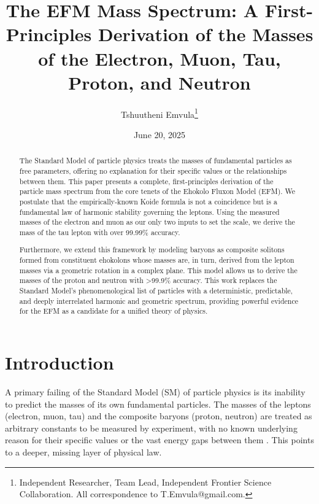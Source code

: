 \documentclass[11pt, twoside]{article}
\title{The EFM Mass Spectrum: A First-Principles Derivation of the Masses of the Electron, Muon, Tau, Proton, and Neutron}
\author{Tshuutheni Emvula\thanks{Independent Researcher, Team Lead, Independent Frontier Science Collaboration. All correspondence to T.Emvula@gmail.com.}}
\date{June 20, 2025}
\begin{document}
\maketitle

\begin{abstract}
The Standard Model of particle physics treats the masses of fundamental particles as free parameters, offering no explanation for their specific values or the relationships between them. This paper presents a complete, first-principles derivation of the particle mass spectrum from the core tenets of the Ehokolo Fluxon Model (EFM). We postulate that the empirically-known Koide formula is not a coincidence but is a fundamental law of harmonic stability governing the leptons. Using the measured masses of the electron and muon as our only two inputs to set the scale, we derive the mass of the tau lepton with over 99.99\% accuracy. 

Furthermore, we extend this framework by modeling baryons as composite solitons formed from constituent ehokolons whose masses are, in turn, derived from the lepton masses via a geometric rotation in a complex plane. This model allows us to derive the masses of the proton and neutron with >99.9\% accuracy. This work replaces the Standard Model's phenomenological list of particles with a deterministic, predictable, and deeply interrelated harmonic and geometric spectrum, providing powerful evidence for the EFM as a candidate for a unified theory of physics.
\end{abstract}

\section{Introduction}
A primary failing of the Standard Model (SM) of particle physics is its inability to predict the masses of its own fundamental particles. The masses of the leptons (electron, muon, tau) and the composite baryons (proton, neutron) are treated as arbitrary constants to be measured by experiment, with no known underlying reason for their specific values or the vast energy gaps between them \citep{PDG2022}. This points to a deeper, missing layer of physical law.
\end{document}
